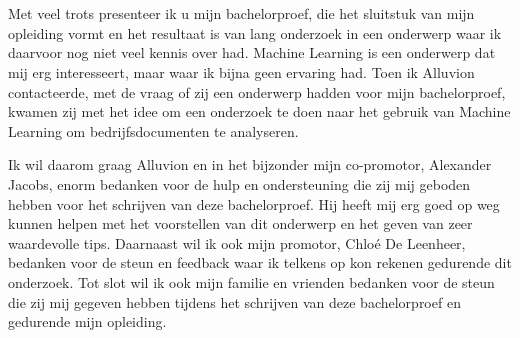 
\chapter*{}%
\label{ch:voorwoord}


Met veel trots presenteer ik u mijn bachelorproef, die het sluitstuk van mijn opleiding vormt en het resultaat is van lang onderzoek in een onderwerp waar ik daarvoor nog niet veel kennis over had. Machine Learning is een onderwerp dat mij erg interesseert, maar waar ik bijna geen ervaring had. Toen ik Alluvion contacteerde, met de vraag of zij een onderwerp hadden voor mijn bachelorproef, kwamen zij met het idee om een onderzoek te doen naar het gebruik van Machine Learning om bedrijfsdocumenten te analyseren. 

Ik wil daarom graag Alluvion en in het bijzonder mijn co-promotor, Alexander Jacobs, enorm bedanken voor de hulp en ondersteuning die zij mij geboden hebben voor het schrijven van deze bachelorproef. Hij heeft mij erg goed op weg kunnen helpen met het voorstellen van dit onderwerp en het geven van zeer waardevolle tips. Daarnaast wil ik ook mijn promotor, Chloé De Leenheer, bedanken voor de steun en feedback waar ik telkens op kon rekenen gedurende dit onderzoek. Tot slot wil ik ook mijn familie en vrienden bedanken voor de steun die zij mij gegeven hebben tijdens het schrijven van deze bachelorproef en gedurende mijn opleiding.